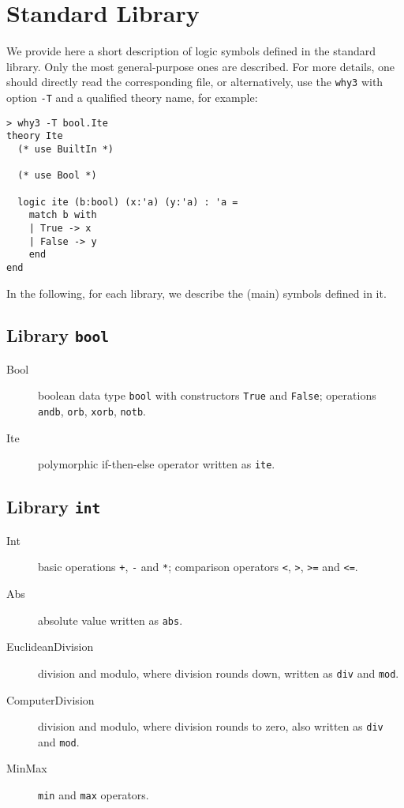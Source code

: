 \chapter{Standard Library}
\label{chap:library}

We provide here a short description of logic symbols defined in the
standard library. Only the most general-purpose ones are
described. For more details, one should directly read the
corresponding file, or alternatively, use the \verb|why3| with option
\verb|-T| and a qualified theory name, for example:
\begin{verbatim}
> why3 -T bool.Ite
theory Ite
  (* use BuiltIn *)
  
  (* use Bool *)
  
  logic ite (b:bool) (x:'a) (y:'a) : 'a =
    match b with
    | True -> x
    | False -> y
    end
end
\end{verbatim}

In the following, for each library, we describe the (main) symbols
defined in it.

\section{Library \texttt{bool}}

\begin{description}

\item[Bool] boolean data type \verb|bool| with constructors \verb|True| and
  \verb|False|; operations \verb|andb|, \verb|orb|, \verb|xorb|, \verb|notb|.

\item[Ite] polymorphic if-then-else operator written as \verb|ite|.

\end{description}

\section{Library \texttt{int}}

\begin{description}

\item[Int] basic operations \verb|+|, \verb|-| and \verb|*|; comparison
  operators \verb|<|, \verb|>|, \verb|>=| and \verb|<=|.

\item[Abs] absolute value written as \verb|abs|.

\item[EuclideanDivision] division and modulo, where division rounds
  down, written as \verb|div| and \verb|mod|.

\item[ComputerDivision] division and modulo, where division rounds to
  zero, also written as \verb|div| and \verb|mod|.

\item[MinMax] \verb|min| and \verb|max| operators.

\end{description}

